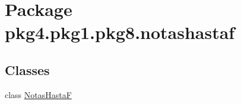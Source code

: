 \hypertarget{namespacepkg4_1_1pkg1_1_1pkg8_1_1notashastaf}{}\section{Package pkg4.\+pkg1.\+pkg8.\+notashastaf}
\label{namespacepkg4_1_1pkg1_1_1pkg8_1_1notashastaf}
\subsection*{Classes}
\begin{DoxyCompactItemize}
\item 
class \mbox{\hyperlink{classpkg4_1_1pkg1_1_1pkg8_1_1notashastaf_1_1_notas_hasta_f}{Notas\+HastaF}}
\end{DoxyCompactItemize}
